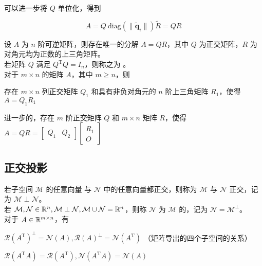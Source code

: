 \documentclass[./main.tex]{subfiles}
\begin{document}
可以进一步将 $Q$ 单位化，得到

\begin{equation}
    A=Q\ \mathrm{diag}(\|\widetilde{\bm{q}}_i\|)\widetilde{R}=QR
\end{equation}

设 $A$ 为 $n$ 阶可逆矩阵，则存在唯一的分解 $A=QR$，其中 $Q$ 为正交矩阵，$R$ 为对角元均为正数的上三角矩阵。\\

若矩阵 $Q$ 满足 $Q^{\mathrm{T}}Q=I_n$，则称之为 。\\

对于 $m\times n$ 的矩阵 $A$，其中 $m\ge n$，则
\begin{enumerate*}
    \item {}存在 $m\times n$ 列正交矩阵 $Q_1$ 和具有非负对角元的 $n$ 阶上三角矩阵 $R_1$，使得 $A=Q_1R_1$
    \item {}进一步的，存在 $m$ 阶正交矩阵 $Q$ 和 $m\times n$ 矩阵 $R$，使得 $A=QR=\begin{bmatrix}Q_1&Q_2\end{bmatrix}\begin{bmatrix}R_1\\O\end{bmatrix}$
\end{enumerate*}

\subsection{正交投影}
若子空间 $\mathcal{M}$ 的任意向量 与 $\mathcal{N}$ 中的任意向量都正交，则称为 $\mathcal{M}$ 与 $\mathcal{N}$ 正交，记为 $\mathcal{M}\perp\mathcal{N}$。\\\indent 若 $\mathcal{M},\mathcal{N}\in\mathbb{R}^{n},\mathcal{M}\perp\mathcal{N},\mathcal{M}\cup\mathcal{N}=\mathbb{R}^{n}$，则称 $\mathcal{N}$ 为 $\mathcal{M}$ 的，记为 $\mathcal{N}=\mathcal{M}^{\perp}$。\\

对于 $A\in\mathbb{R}^{m\times n}$，有
\begin{enumerate*}
    \item $\mathcal{R}(A^{\mathrm{T}})^{\perp}=\mathcal{N}(A),\mathcal{R}(A)^{\perp}=\mathcal{N}(A^{\mathrm{T}})$ （矩阵导出的四个子空间的关系）
    \item $\mathcal{R}(A^{\mathrm{T}}A)=\mathcal{R}(A^{\mathrm{T}}),\mathcal{N}(A^{\mathrm{T}}A)=\mathcal{N}(A)$
\end{enumerate*}
\end{document}
